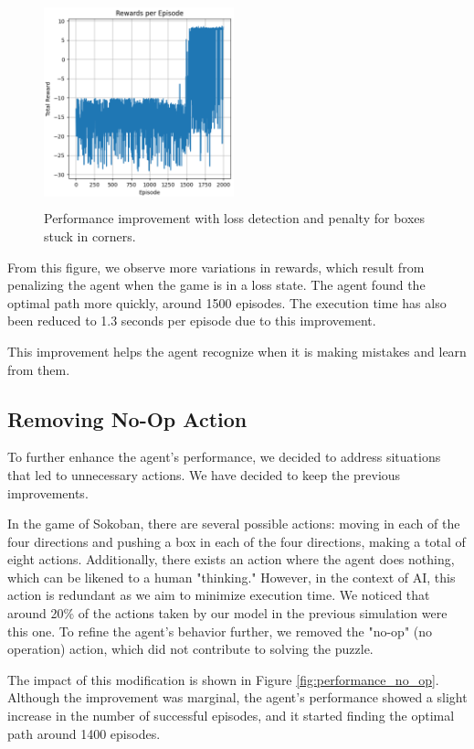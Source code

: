\documentclass[10pt,twocolumn]{article}
\begin{document}
\begin{figure}[ht]
    \centering
    \includegraphics[width=0.49\textwidth,height=6cm]{Images/performance_wall_detection.png}
    \caption{Performance improvement with loss detection and penalty for boxes stuck in corners.}
    \label{fig:performance_wall_detection}
\end{figure}

From this figure, we observe more variations in rewards, which result from penalizing the agent when the game is in a loss state. The agent found the optimal path more quickly, around 1500 episodes. The execution time has also been reduced to 1.3 seconds per episode due to this improvement.

This improvement helps the agent recognize when it is making mistakes and learn from them.

\subsection{Removing No-Op Action}

To further enhance the agent's performance, we decided to address situations that led to unnecessary actions. We have decided to keep the previous improvements.

In the game of Sokoban, there are several possible actions: moving in each of the four directions and pushing a box in each of the four directions, making a total of eight actions. Additionally, there exists an action where the agent does nothing, which can be likened to a human "thinking." However, in the context of AI, this action is redundant as we aim to minimize execution time. We noticed that around 20\% of the actions taken by our model in the previous simulation were this one. To refine the agent's behavior further, we removed the "no-op" (no operation) action, which did not contribute to solving the puzzle.

The impact of this modification is shown in Figure \ref{fig:performance_no_op}. Although the improvement was marginal, the agent's performance showed a slight increase in the number of successful episodes, and it started finding the optimal path around 1400 episodes.
\end{document}
